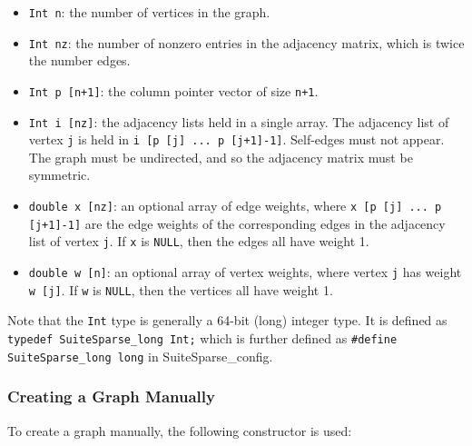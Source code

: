 \documentclass[letter]{article}
\begin{document}
    \begin{itemize}
    \item \texttt{Int n}: the number of vertices in the graph.
    \item \texttt{Int nz}: the number of nonzero entries in the adjacency matrix,
        which is twice the number edges.
    \item \texttt{Int p [n+1]}: the column pointer vector of size \texttt{n+1}.
    \item \texttt{Int i [nz]}: the adjacency lists held in a single array.  The adjacency
        list of vertex \texttt{j} is held in \texttt{i [p [j] ... p [j+1]-1]}.
        Self-edges must not appear.
        The graph must be undirected, and so the adjacency matrix must be symmetric.
    \item \texttt{double x [nz]}: an optional array of edge weights, where
        \texttt{x [p [j] ... p [j+1]-1]} are the edge weights of the corresponding
        edges in the adjacency list of vertex \texttt{j}.
        If \texttt{x} is \texttt{NULL}, then the edges all have weight 1.
    \item \texttt{double w [n]}: an optional array of vertex weights,
        where vertex \texttt{j} has weight \texttt{w [j]}.
        If \texttt{w} is \texttt{NULL}, then the vertices all have weight 1.
    \end{itemize}
    
Note that the \texttt{Int} type is generally a 64-bit (long) integer type. It is defined as \texttt{typedef SuiteSparse\_long Int;} which is further defined as \texttt{\#define SuiteSparse\_long long} in SuiteSparse\_config.

\subsubsection{Creating a Graph Manually}

To create a graph manually, the following constructor is used: \\
\end{document}
